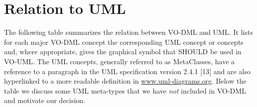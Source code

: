 \documentclass[10pt,a4paper]{ivoa}
\begin{document}
\hypertarget{relation-to-uml}{%
\section{Relation to UML}\label{relation-to-uml}}

The following table summarizes the relation between VO-DML and UML. It
lists for each major VO-DML concept the corresponding UML concept or
concepts and, where appropriate, gives the graphical symbol that SHOULD
be used in VO-UML. The UML concepts, generally referred to as
MetaClasses, have a reference to a paragraph in the UML specification
version 2.4.1 {[}13{]} and are also hyperlinked to a more readable
definition in \href{http://www.uml-diagrams.org}{www.uml-diagrams.org}.
Below the table we discuss some UML meta-types that we have \emph{not}
included in VO-DML and motivate our decision.
\end{document}
